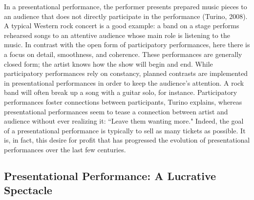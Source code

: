 In a presentational performance, the performer presents prepared music pieces to an audience that does not directly participate in the performance (Turino, 2008). A typical Western rock concert is a good example: a band on a stage performs rehearsed songs to an attentive audience whose main role is listening to the music. In contrast with the open form of participatory performances, here there is a focus on detail, smoothness, and coherence. These performances are generally closed form; the artist knows how the show will begin and end. While participatory performances rely on constancy, planned contrasts are implemented in presentational performances in order to keep the audience's attention. A rock band will often break up a song with a guitar solo, for instance. Participatory performances foster connections between participants, Turino explains, whereas presentational performances seem to tease a connection between artist and audience without ever realizing it: ``Leave them wanting more." Indeed, the goal of a presentational performance is typically to sell as many tickets as possible. It is, in fact, this desire for profit that has progressed the evolution of presentational performances over the last few centuries.

\subsection{Presentational Performance: A Lucrative Spectacle}

